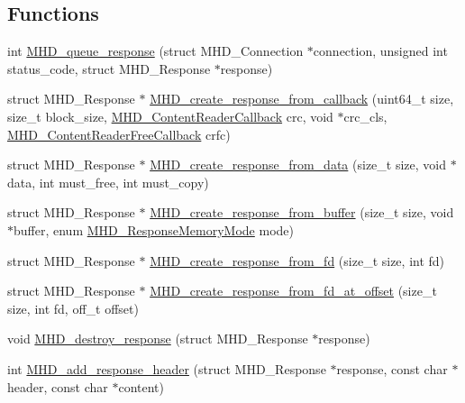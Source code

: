 \subsection*{\-Functions}
\begin{DoxyCompactItemize}
\item 
int \hyperlink{group__response_gaa0ee587cdd6d860add50dbeb62a81fe1}{\-M\-H\-D\-\_\-queue\-\_\-response} (struct \-M\-H\-D\-\_\-\-Connection $\ast$connection, unsigned int status\-\_\-code, struct \-M\-H\-D\-\_\-\-Response $\ast$response)
\item 
struct \-M\-H\-D\-\_\-\-Response $\ast$ \hyperlink{group__response_gac56767f937d8085d4204db4fdbef0516}{\-M\-H\-D\-\_\-create\-\_\-response\-\_\-from\-\_\-callback} (uint64\-\_\-t size, size\-\_\-t block\-\_\-size, \hyperlink{microhttpd_8h_adcaa9f4bc6cba2a886b3648489040ee3}{\-M\-H\-D\-\_\-\-Content\-Reader\-Callback} crc, void $\ast$crc\-\_\-cls, \hyperlink{group__response_gae678e9aeb43b374f595d082737b68272}{\-M\-H\-D\-\_\-\-Content\-Reader\-Free\-Callback} crfc)
\item 
struct \-M\-H\-D\-\_\-\-Response $\ast$ \hyperlink{group__response_gad45919f3a1fc9cbe10ceaf01bd37b738}{\-M\-H\-D\-\_\-create\-\_\-response\-\_\-from\-\_\-data} (size\-\_\-t size, void $\ast$data, int must\-\_\-free, int must\-\_\-copy)
\item 
struct \-M\-H\-D\-\_\-\-Response $\ast$ \hyperlink{group__response_ga744262e62f0f14b64cbebbdd9128c63a}{\-M\-H\-D\-\_\-create\-\_\-response\-\_\-from\-\_\-buffer} (size\-\_\-t size, void $\ast$buffer, enum \hyperlink{group__response_ga82593e08ec5cd3fe305590c804c4649d}{\-M\-H\-D\-\_\-\-Response\-Memory\-Mode} mode)
\item 
struct \-M\-H\-D\-\_\-\-Response $\ast$ \hyperlink{group__response_gaea51561acd8f0c64b1cc18ba1861eb4e}{\-M\-H\-D\-\_\-create\-\_\-response\-\_\-from\-\_\-fd} (size\-\_\-t size, int fd)
\item 
struct \-M\-H\-D\-\_\-\-Response $\ast$ \hyperlink{group__response_ga7be995aca61905c011f767613083918a}{\-M\-H\-D\-\_\-create\-\_\-response\-\_\-from\-\_\-fd\-\_\-at\-\_\-offset} (size\-\_\-t size, int fd, off\-\_\-t offset)
\item 
void \hyperlink{group__response_gab34675107fb6ab6de301776b1fdff3f5}{\-M\-H\-D\-\_\-destroy\-\_\-response} (struct \-M\-H\-D\-\_\-\-Response $\ast$response)
\item 
int \hyperlink{group__response_ga2091d2691bb976dc32606f6a2ead60bb}{\-M\-H\-D\-\_\-add\-\_\-response\-\_\-header} (struct \-M\-H\-D\-\_\-\-Response $\ast$response, const char $\ast$header, const char $\ast$content)

\end{DoxyCompactItemize}
